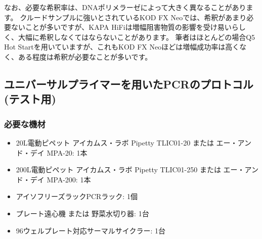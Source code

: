 \documentclass[titlepage,10pt,a4paper]{jsbook}
\begin{document}
なお、必要な希釈率は、DNAポリメラーゼによって大きく異なることがあります。
クルードサンプルに強いとされているKOD FX Neoでは、希釈があまり必要ないことが多いですが、KAPA HiFiは増幅阻害物質の影響を受け易いらしく、大幅に希釈しなくてはならないことがあります。
筆者はほとんどの場合Q5 Hot Startを用いていますが、これもKOD FX Neoほどは増幅成功率は高くなく、ある程度は希釈が必要なことが多いです。

\subsection{ユニバーサルプライマーを用いたPCRのプロトコル (テスト用)}

\subsubsection{必要な機材}
\begin{itemize}
\item 20{\textmu}L電動ピペット アイカムス・ラボ Pipetty TLIC01-20 または エー・アンド・デイ MPA-20: 1本
\item 200{\textmu}L電動ピペット アイカムス・ラボ Pipetty TLIC01-250 または エー・アンド・デイ MPA-200: 1本
\item アイソフリーズラックPCRラック: 1個
\item プレート遠心機 または 野菜水切り器: 1台
\item 96ウェルプレート対応サーマルサイクラー: 1台
\end{itemize}
\end{document}
